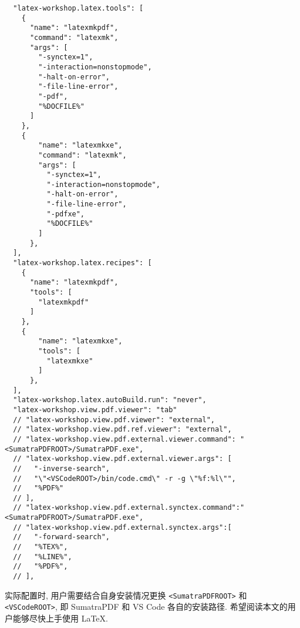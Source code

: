 \begin{lstlisting}
  "latex-workshop.latex.tools": [
    {
      "name": "latexmkpdf",
      "command": "latexmk",
      "args": [
        "-synctex=1",
        "-interaction=nonstopmode",
        "-halt-on-error",
        "-file-line-error",
        "-pdf",
        "%DOCFILE%"
      ]
    },
    {
        "name": "latexmkxe",
        "command": "latexmk",
        "args": [
          "-synctex=1",
          "-interaction=nonstopmode",
          "-halt-on-error",
          "-file-line-error",
          "-pdfxe",
          "%DOCFILE%"
        ]
      },
  ],
  "latex-workshop.latex.recipes": [
    {
      "name": "latexmkpdf",
      "tools": [
        "latexmkpdf"
      ]
    },
    {
        "name": "latexmkxe",
        "tools": [
          "latexmkxe"
        ]
      },
  ],
  "latex-workshop.latex.autoBuild.run": "never",
  "latex-workshop.view.pdf.viewer": "tab"
  // "latex-workshop.view.pdf.viewer": "external",
  // "latex-workshop.view.pdf.ref.viewer": "external",
  // "latex-workshop.view.pdf.external.viewer.command": "<SumatraPDFROOT>/SumatraPDF.exe",
  // "latex-workshop.view.pdf.external.viewer.args": [
  //   "-inverse-search",
  //   "\"<VSCodeROOT>/bin/code.cmd\" -r -g \"%f:%l\"",
  //   "%PDF%"
  // ],
  // "latex-workshop.view.pdf.external.synctex.command":"<SumatraPDFROOT>/SumatraPDF.exe",
  // "latex-workshop.view.pdf.external.synctex.args":[
  //   "-forward-search",
  //   "%TEX%",
  //   "%LINE%",
  //   "%PDF%",
  // ],
\end{lstlisting}

实际配置时,
用户需要结合自身安装情况更换 \texttt{<SumatraPDFROOT>} 和 \texttt{<VSCodeROOT>},
即 SumatraPDF 和 VS Code 各自的安装路径.
希望阅读本文的用户能够尽快上手使用 \LaTeX.
